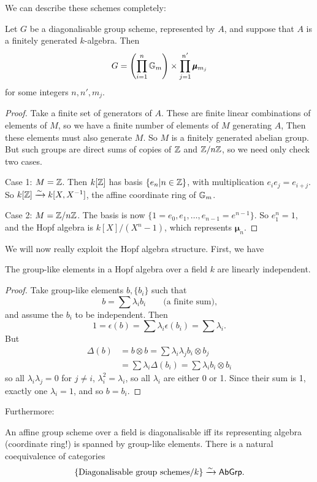 \documentclass{memoir}
\begin{document}
We can describe these schemes completely:
\begin{theorem}\label{thm:struct_of_diag_gps}
	Let $ G $ be a diagonalisable group scheme, represented by $ A $, and suppose that $ A $ is a finitely generated $ k $-algebra.
	Then
	\[ G=\left(\prod_{i=1}^{n}{\mathbb{G}_m}\right)\times\prod_{j=1}^{n'}\pmb{\mu}_{m_j} \] for some integers $ n,n', m_j$. 
\end{theorem}
\begin{proof}
	Take a finite set of generators of $ A $. These are finite linear combinations of elements of $ M $, so we have a finite number of elements of $ M $ generating $ A $, Then these elements must also generate $ M $. So $ M $ is a finitely generated abelian group. But such groups are direct sums of copies of $ \mathbb{Z} $ and $ \mathbb{Z}/n\mathbb{Z} $, so we need only check two cases.
	
	Case 1: $ M=\mathbb{Z} $. Then $ k[\mathbb{Z}] $ has basis $ \{e_n|n\in \mathbb{Z}\} $, with multiplication $ e_i e_j = e_{i+j} $. So $ k[\mathbb{Z}]\xrightarrow{\sim} k[X, X^{-1}] $, the affine coordinate ring of $ {\mathbb{G}_m} $.

	Case 2: $ M=\mathbb{Z}/n\mathbb{Z} $. The basis is now $ \{1=e_0, e_1,\dots, e_{n-1}=e^{n-1}\} $. So $ e_1^n=1 $, and the Hopf algebra is $ k[X]/(X^n-1) $, which represents $ \pmb\mu_n $.
\end{proof}
We will now really exploit the Hopf algebra structure. First, we have
\begin{lemma}\label{lem:gplikes_lin_indep}
	The group-like elements in a Hopf algebra over a field $ k $ are linearly independent.
\end{lemma}
\begin{proof}
	Take group-like elements $ b, \{b_i\} $ such that \[ b=\sum\lambda_ib_i\qquad\textrm{(a finite sum),} \]
	and assume the $ b_i $ to be independent. Then
	\[ 1=\epsilon(b)=\sum\lambda_i\epsilon(b_i)=\sum\lambda_i. \]
	But \begin{align*} \Delta(b)&=b\otimes b=\sum \lambda_i\lambda_jb_i\otimes b_j\\
	&=\sum\lambda_i\Delta(b_i)=\sum\lambda_ib_i\otimes b_i\end{align*} so all $ \lambda_i\lambda_j=0 $ for $ j\ne i $, $ \lambda_i^2=\lambda_i $, so all $ \lambda_i $ are either 0 or 1. Since their sum is 1, exactly one $ \lambda_i =1$, and so $ b=b_i $.
\end{proof}
Furthermore:
\begin{theorem}\label{thm:diagon_implies_cring_is_span_of_gplikes}
	An affine group scheme over a field is diagonalisable iff its representing algebra (coordinate ring!) is spanned by group-like elements. There is a natural coequivalence of categories\[ \{\textrm{Diagonalisable group schemes}/k\}\xrightarrow{\sim} {\normalfont\mathsf{AbGrp}}. \]
\end{theorem}
\end{document}
